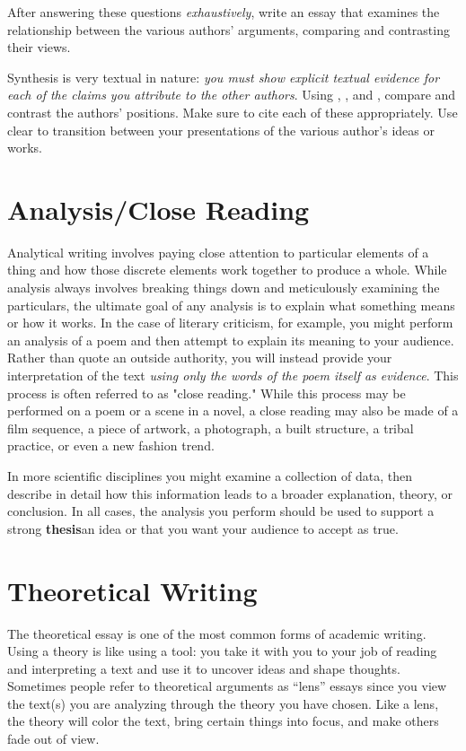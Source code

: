 \noindent After answering these questions \emph{exhaustively}, write an essay
that examines the relationship between the various authors’ arguments, comparing
and contrasting their views.

Synthesis is very textual in nature: \emph{you must show explicit textual
evidence for each of the claims you attribute to the other authors}. Using
\hyperlink{summary}{\color{Ahrenge}{summary}},
\hyperlink{paraphrase}{\color{Ahrenge}{paraphrase}}, and
\hyperlink{quotation}{\color{Ahrenge}{quotation}}, compare and contrast the
authors’ positions. Make sure to cite each of these appropriately. Use clear
\hyperlink{signalphrase}{\color{Ahrenge}{signal phrases}} to transition between
your presentations of the various author’s ideas or works.

\hypertarget{closereadingessay}{} \section{Analysis/Close Reading} Analytical
writing involves paying close attention to particular elements of a thing and
how those discrete elements work together to produce a whole. While analysis
always involves breaking things down and meticulously examining the particulars,
the ultimate goal of any analysis is to explain what something means or how it
works. In the case of literary criticism, for example, you might perform an analysis of a
poem and then attempt to explain its meaning to your audience.  Rather than
quote an outside authority, you will instead provide your interpretation
of the text \emph{using only the words of the poem itself as evidence}. This process is
often referred to as "close reading." While this process may be performed on a
poem or a scene in a novel, a close reading may also be made of a film
sequence, a piece of artwork, a photograph, a built structure, a tribal practice, or
even a new fashion trend.

In more scientific disciplines you might examine a collection of data, then
describe in detail how this information leads to a broader explanation, theory,
or conclusion. In all cases, the analysis you perform should be used to support
a strong \textbf{thesis}\textemdash an idea or that you want your audience to accept as
true.

\hypertarget{theoreticalessay}{} \section{Theoretical Writing} The theoretical
essay is one of the most common forms of academic writing. Using a theory is
like using a tool: you take it with you to your job of reading and interpreting
a text and use it to uncover ideas and shape thoughts. Sometimes people refer to
theoretical arguments as “lens” essays since you view the text(s) you are
analyzing through the theory you have chosen. Like a lens, the theory will color
the text, bring certain things into focus, and make others fade out of view.


